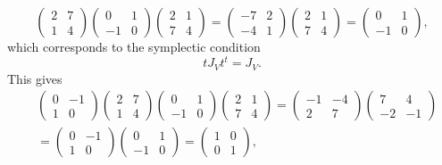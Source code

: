 \documentclass[aps,preprint]{revtex4}
\begin{document}
\begin{equation}
\left( 
\begin{array}{cc}
2 & 7 \\ 
1 & 4%
\end{array}%
\right) \left( 
\begin{array}{cc}
0 & 1 \\ 
-1 & 0%
\end{array}%
\right) \left( 
\begin{array}{cc}
2 & 1 \\ 
7 & 4%
\end{array}%
\right) =\left( 
\begin{array}{cc}
-7 & 2 \\ 
-4 & 1%
\end{array}%
\right) \left( 
\begin{array}{cc}
2 & 1 \\ 
7 & 4%
\end{array}%
\right) =\left( 
\begin{array}{cc}
0 & 1 \\ 
-1 & 0%
\end{array}%
\right) ,
\end{equation}%
which corresponds to the symplectic condition 
\begin{equation}
tJ_{V}t^{t}=J_{V}.
\end{equation}%
This gives 
\begin{align}
& \left( 
\begin{array}{cc}
0 & -1 \\ 
1 & 0%
\end{array}%
\right) \left( 
\begin{array}{cc}
2 & 7 \\ 
1 & 4%
\end{array}%
\right) \left( 
\begin{array}{cc}
0 & 1 \\ 
-1 & 0%
\end{array}%
\right) \left( 
\begin{array}{cc}
2 & 1 \\ 
7 & 4%
\end{array}%
\right) =\left( 
\begin{array}{cc}
-1 & -4 \\ 
2 & 7%
\end{array}%
\right) \left( 
\begin{array}{cc}
7 & 4 \\ 
-2 & -1%
\end{array}%
\right) \\
& =\left( 
\begin{array}{cc}
0 & -1 \\ 
1 & 0%
\end{array}%
\right) \left( 
\begin{array}{cc}
0 & 1 \\ 
-1 & 0%
\end{array}%
\right) =\left( 
\begin{array}{cc}
1 & 0 \\ 
0 & 1%
\end{array}%
\right) ,
\end{align}%
\end{document}
